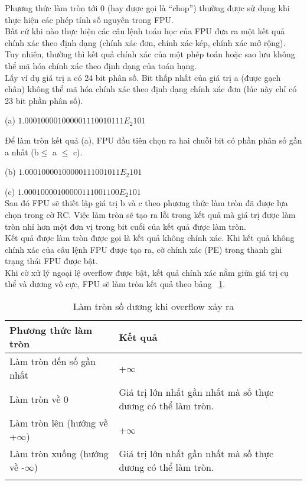 	Phương thức làm tròn tới 0 (hay được gọi là “chop”) thường được sử dụng khi thực hiện các phép tính số nguyên trong FPU. \\
	
	Bất cứ khi nào thực hiện các câu lệnh toán học của FPU đưa ra một kết quả chính xác theo định dạng (chính xác đơn, chính xác kép, chính xác mở rộng). Tuy nhiên, thường thì kết quả chính xác của một phép toán hoặc sao lưu không thể mã hóa chính xác theo định dạng của toán hạng.\\
	
	Lấy ví dụ giá trị a có 24 bit phân số. Bit thấp nhất của giá trị a (được gạch chân) không thể mã hóa chính xác theo định dạng chính xác đơn (lúc này chỉ có 23 bit phần phân số).
	
		(a)	$1.0001 0000 1000 0011 1001 0111E_{2} 101$
		
		Để làm tròn kết quả (a), FPU đầu tiên chọn ra hai chuỗi bit có phần phân số gần a nhất (b$\mathbb{\le}$ a $\mathbb{\le}$ c).
		
		(b) $1.0001 0000 1000 0011 1001 011E_{2} 101$
		
		(c)  $1.0001 0000 1000 0011 1001 100E_{2} 101$\\
				
		Sau đó FPU sẽ thiết lập giá trị b và c theo phương thức làm tròn đã được lựa chọn trong cờ RC. Việc làm tròn sẽ tạo ra lỗi trong kết quả mà giá trị được làm tròn nhỉ hơn một đơn vị trong bit cuối của kết quả được làm tròn.\\
		
	Kết quả được làm tròn được gọi là kết quả không chính xác. Khi kết quả không chính xác của câu lệnh FPU được tạo ra, cờ chính xác (PE) trong thanh ghi trạng thái FPU được bật.\\	
	
	Khi cờ xử lý ngoại lệ overflow được bật, kết quả chính xác nằm giữa giá trị cụ thể  và dương vô cực, FPU sẽ làm tròn kết quả theo bảng ~\ref{tb:RCOverflow}.
		\begin{longtable} {|m{6cm}|m{6cm}|}
			\hline
				Phương thức làm tròn & Kết quả \\			
			\hline						
			\hline
				Làm tròn đến số gần nhất & +$\mathbf{\infty}$\\
			\hline
				Làm tròn về 0 & Giá trị lớn nhất gần nhất mà số thực dương có thể làm tròn.\\
			\hline
				Làm tròn lên (hướng về +$\mathbf{\infty}$) &  +$\mathbf{\infty}$\\
			\hline
				Làm tròn xuống (hướng về -$\mathbf{\infty}$) & Giá trị lớn nhất gần nhất mà số thực dương có thể làm tròn.\\		
			\hline
			\caption{Làm tròn số dương khi overflow xảy ra}
			\label{tb:RCOverflow}
		\end{longtable}

